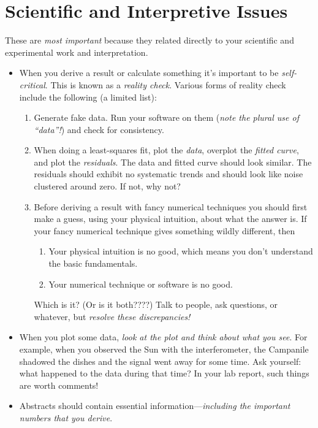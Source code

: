 \documentclass[11pt,preprint]{aastex}
\begin{document}
\section{Scientific and Interpretive Issues}

	These are {\it most important} because they related directly to
your scientific and experimental work and interpretation. 
\begin{itemize}

\item When you derive a result or calculate something it's important to
be {\it self-critical}. This is known as a {\it reality check}. Various forms
of reality check include the following (a limited list):
\begin{enumerate}

	\item Generate fake data. Run your software on them ({\it note
the plural use of ``data''!}) and check for consistency. 

	\item When doing a least-squares fit, plot the {\it data},
overplot the {\it fitted curve}, and plot the {\it residuals}. The data
and fitted curve should look similar. The residuals should exhibit no
systematic trends and should look like noise clustered around zero. If
not, why not?

	\item Before deriving a result with fancy numerical techniques
you should first make a guess, using your physical intuition, about what the
answer is. If your fancy numerical technique gives something wildly
different, then  \begin{enumerate}

	\item Your physical intuition is no good, which means you don't
understand the basic fundamentals. 

	\item Your numerical technique or software is no good.
\end{enumerate}

\noindent Which is it? (Or is it both????) Talk to people, ask
questions, or whatever, but {\it resolve these discrepancies!}

\end{enumerate}

	\item When you plot some data, {\it look at the plot and
think about what you see}.  For example, when you observed the Sun
with the interferometer, the Campanile shadowed the dishes and the
signal went away for some time.  Ask yourself: what happened to the data
during that time? In your lab report, such things are worth comments!

\item Abstracts should contain essential information---{\it including the
important numbers that you derive}. 

\end{itemize}
\end{document}
